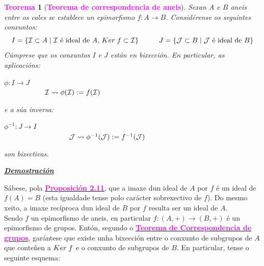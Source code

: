 \documentclass[twoside]{report}
\newcommand{\magbf}[1]{\textcolor{magenta}{\textbf{#1}}} %
\theoremstyle{mystyle}
\newtheorem{theo}{\magbf{Teorema}}[chapter]
\newenvironment{theorem}
{\begin{mdframed}[linecolor = magenta,backgroundcolor = classicrose, linewidth = 2mm]\begin{theo}}
{\end{theo}\end{mdframed}}
\begin{document}
\begin{theorem} [\magbf{Teorema de correspondencia de aneis}] \label{th2.4}
Sexan $A$ e $B$ aneis entre os cales se establece un epimorfismo $f: A \longrightarrow B$. Considérense os seguintes conxuntos:
$$I = \{\mathcal{I} \subset A \hspace{1mm} | \hspace{1mm} \mathcal{I} \text{ é ideal de }A \text{, }Ker \hspace{1mm} f \subset \mathcal{I}\} \hspace{10mm} J = \{\mathcal{J} \subset B \hspace{1mm} | \hspace{1mm} \mathcal{J} \text{ é ideal de } B\}$$
\noindent Cúmprese que os conxuntos $I$ e $J$ están en bixección. En particular, as aplicacións: 
    \begin{center}
            $\phi: I \longrightarrow J$ \\
        \vspace{2mm}
        $\hspace{20mm} \mathcal{I} \leadsto \phi(\mathcal{I}) := f(\mathcal{I})$
    \end{center} 
\noindent e a súa inversa:
    \begin{center}
            $\phi^{-1}: J \longrightarrow I$ \\
        \vspace{2mm}
        $\hspace{32mm} \mathcal{J} \leadsto \phi^{-1}(\mathcal{J}) := f^{-1}(\mathcal{J})$
    \end{center} 
\noindent son bixectivas.
\end{theorem}

\vspace{2mm}

\noindent \textbf{\textit{\underline{Demostración}}}

\vspace{2mm}

\noindent Sábese, pola \hyperref[prop2.11]{\magbf{Proposición 2.11}}, que a imaxe dun ideal de $A$ por $f$ é un ideal de $f(A) = B$ (esta igualdade tense polo carácter sobrexectivo de $f$). Do mesmo xeito, a imaxe recíproca dun ideal de $B$ por $f$ resulta ser un ideal de $A$.\\

\noindent Sendo $f$ un epimorfismo de aneis, en particular $f: (A, +) \longrightarrow (B,+)$ é un epimorfismo de grupos. Entón, segundo o \hyperref[th1.8]{\magbf{Teorema de Correspondencia de grupos}}, garántese que existe unha bixección entre o conxunto de subgrupos de $A$ que conteñen a $Ker \hspace{1mm} f$ e o conxunto de subgrupos de $B$. En particular, tense o seguinte esquema:
\end{document}
